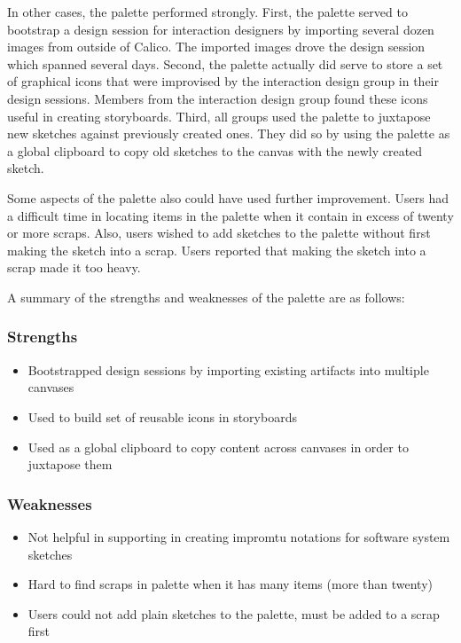 In other cases, the palette performed strongly. First, the palette served to bootstrap a design session for interaction designers by importing several dozen images  from outside of Calico. The imported images drove the design session which spanned several days. Second, the palette actually did serve to store a set of graphical icons that were improvised by the interaction design group in their design sessions. Members from the interaction design group found these icons useful in creating storyboards. Third, all groups used the palette to juxtapose new sketches against previously created ones. They did so by using the palette as a global clipboard to copy old sketches to the canvas with the newly created sketch.

Some aspects of the palette also could have used further improvement. Users had a difficult time in locating items in the palette when it contain in excess of twenty or more scraps. Also, users wished to add sketches to the palette without first making the sketch into a scrap. Users reported that making the sketch into a scrap made it too heavy.

A summary of the strengths and weaknesses of the palette are as follows:

\subsubsection{Strengths}

\begin{itemize}
	\item Bootstrapped design sessions by importing existing artifacts into multiple canvases
	\item Used to build set of reusable icons in storyboards
	\item Used as a global clipboard to copy content across canvases in order to juxtapose them
\end{itemize}

\subsubsection{Weaknesses}
\begin{itemize}
	\item Not helpful in supporting in creating impromtu notations for software system sketches
	\item Hard to find scraps in palette when it has many items (more than twenty)
	\item Users could not add plain sketches to the palette, must be added to a scrap first
\end{itemize}


